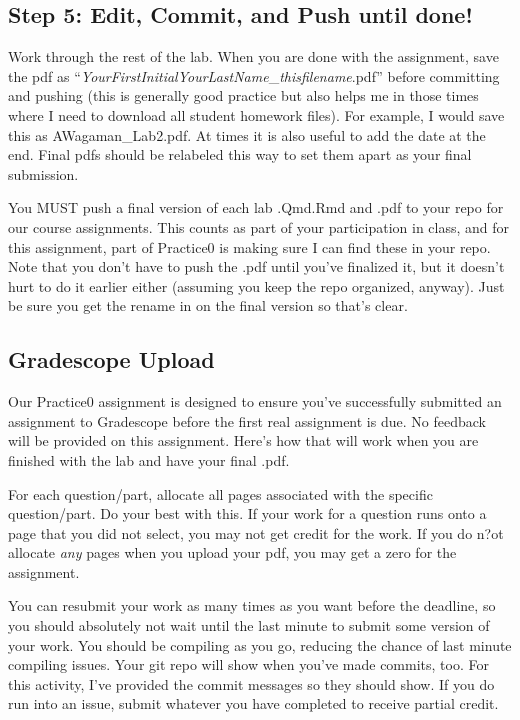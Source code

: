 \documentclass[
  letterpaper,
  DIV=11,
  numbers=noendperiod]{scrartcl}
\begin{document}
\hypertarget{step-5-edit-commit-and-push-until-done}{%
\subsection{Step 5: Edit, Commit, and Push until
done!}\label{step-5-edit-commit-and-push-until-done}}

Work through the rest of the lab. When you are done with the assignment,
save the pdf as
``\emph{YourFirstInitialYourLastName}\_\emph{thisfilename}.pdf'' before
committing and pushing (this is generally good practice but also helps
me in those times where I need to download all student homework files).
For example, I would save this as AWagaman\_Lab2.pdf. At times it is
also useful to add the date at the end. Final pdfs should be relabeled
this way to set them apart as your final submission.

You MUST push a final version of each lab .Qmd.Rmd and .pdf to your repo
for our course assignments. This counts as part of your participation in
class, and for this assignment, part of Practice0 is making sure I can
find these in your repo. Note that you don't have to push the .pdf until
you've finalized it, but it doesn't hurt to do it earlier either
(assuming you keep the repo organized, anyway). Just be sure you get the
rename in on the final version so that's clear.

\hypertarget{gradescope-upload}{%
\subsection{Gradescope Upload}\label{gradescope-upload}}

Our Practice0 assignment is designed to ensure you've successfully
submitted an assignment to Gradescope before the first real assignment
is due. No feedback will be provided on this assignment. Here's how that
will work when you are finished with the lab and have your final .pdf.

For each question/part, allocate all pages associated with the specific
question/part. Do your best with this. If your work for a question runs
onto a page that you did not select, you may not get credit for the
work. If you do n?ot allocate \emph{any} pages when you upload your pdf,
you may get a zero for the assignment.

You can resubmit your work as many times as you want before the
deadline, so you should absolutely not wait until the last minute to
submit some version of your work. You should be compiling as you go,
reducing the chance of last minute compiling issues. Your git repo will
show when you've made commits, too. For this activity, I've provided the
commit messages so they should show. If you do run into an issue, submit
whatever you have completed to receive partial credit.
\end{document}

